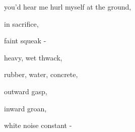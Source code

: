 \documentclass[extrafontsizes, 48pt]{memoir}
\newcommand\blankpage{%
    \null
    \thispagestyle{empty}%
    \addtocounter{page}{-1}%
    \newpage}
\begin{document}
	\begin{minipage}{.6\textwidth}
	you'd hear me hurl myself at the ground,
	\end{minipage}
	\newpage

	\begin{minipage}{.6\textwidth}
	in sacrifice,
	\end{minipage}
	\newpage

	\begin{minipage}{.6\textwidth}
	faint squeak -
	\end{minipage}
	\newpage

	\begin{minipage}{.6\textwidth}
	heavy, wet thwack,
	\end{minipage}
	\newpage

	\begin{minipage}{.6\textwidth}
	rubber, water, concrete,
	\end{minipage}
	\newpage

	\begin{minipage}{.6\textwidth}
	outward gasp,
	\end{minipage}
	\newpage

	\begin{minipage}{.6\textwidth}
	inward groan,
	\afterpage{\blankpage}
	\end{minipage}
	\newpage

	\begin{minipage}{.6\textwidth}
	white noise constant -
	\end{minipage}
	\newpage
\end{document}
